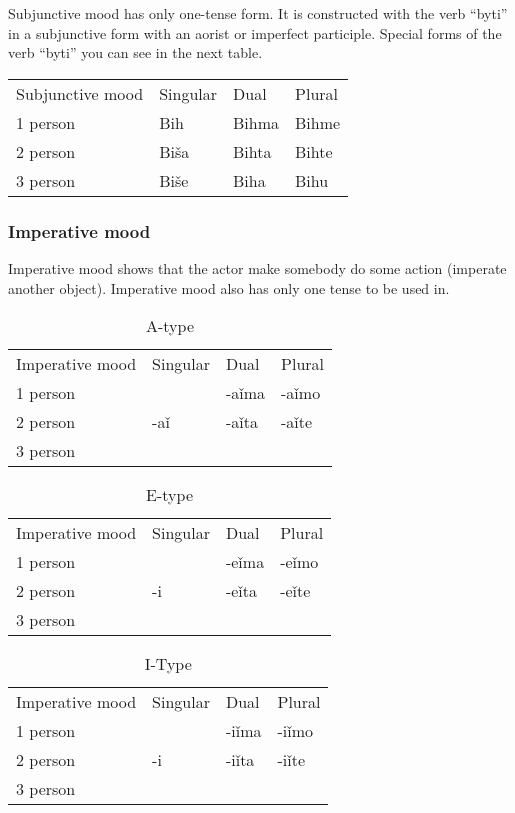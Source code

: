 Subjunctive mood has only one-tense form. It is constructed with the verb “byti” in a subjunctive form with an aorist or imperfect participle. Special forms of the verb “byti” you can see in the next table.

\begin{table}
	\begin{tabular}{llll}
		Subjunctive mood & Singular & Dual & Plural \\
		1 person & Bih & Bihma & Bihme \\
		2 person & Biša & Bihta & Bihte \\
		3 person & Biše & Biha & Bihu
	\end{tabular}
\end{table}

\subsubsection{Imperative mood}

Imperative mood shows that the actor make somebody do some action (imperate another object). Imperative mood also has only one tense to be used in. 

\begin{table}
	\caption{A-type}
	\begin{tabular}{llll}
		Imperative mood & Singular & Dual & Plural \\
		1 person &  & -aǐma & -aǐmo \\
		2 person & -aǐ & -aǐta & -aǐte \\
		3 person &  &  & 
	\end{tabular}
\end{table}



\begin{table}
	\caption{E-type}
	\begin{tabular}{llll}
		Imperative mood & Singular & Dual & Plural \\
		1 person &  & -eǐma & -eǐmo \\
		2 person & -i & -eǐta & -eǐte \\
		3 person &  &  & 
	\end{tabular}
\end{table}



\begin{table}
	\caption{I-Type}
	\begin{tabular}{llll}
		Imperative mood & Singular & Dual & Plural \\
		1 person &  & -iǐma & -iǐmo \\
		2 person & -i & -iǐta & -iǐte \\
		3 person &  &  & 
	\end{tabular}
\end{table}


